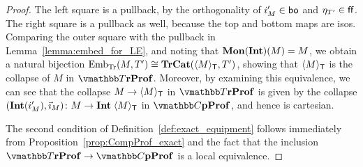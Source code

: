 \documentclass[11pt,oneside,article]{memoir}
\begin{document}
\begin{proof}

   The left square is a pullback, by the orthogonality of $i'_M\in\mathsf{bo}$ and $\eta_{T'}\in\mathsf{ff}$.
   The right square is a pullback as well, because the top and bottom maps are isos. Comparing the outer square with the pullback in Lemma~\ref{lemma:embed_for_LE}, and noting that $\mathbf{Mon}(\mathbf{Int})(M)=M$, we obtain a natural bijection
   $\mathrm{Emb}_{\mathrm{Tr}}(M,T')\cong\mathbf{TrCat}(\langle M\rangle_{\mathsf{T}},T')$, showing that $\langle M\rangle_{\mathsf{T}}$ is the collapse of
   $M$ in $\dTrProf$. Moreover, by examining this equivalence, we can see that the collapse $M\to
   \langle M\rangle_{\mathsf{T}}$ in $\dTrProf$ is given by the collapse $(\mathbf{Int}(i'_M),\vec{\imath}_M)\colon M\to\mathbf{Int}\;\langle M\rangle_{\mathsf{T}}$ in
   $\dCompProf$, and hence is cartesian.

   The second condition of Definition~\ref{def:exact_equipment} follows immediately from Proposition~\ref{prop:CompProf_exact} and the fact that the inclusion $\dTrProf\to\dCompProf$ is a local equivalence.
\end{proof}
\end{document}
